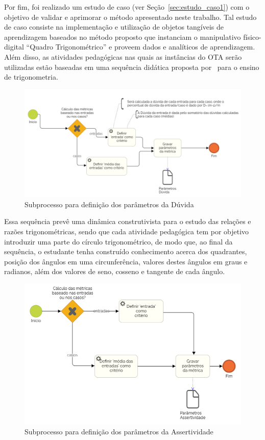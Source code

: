 Por fim, foi realizado um estudo de caso (ver Seção~\ref{sec:estudo_caso1}) com o objetivo de validar e aprimorar o método apresentado neste trabalho. Tal estudo de caso consiste na implementação e utilização de objetos tangíveis de aprendizagem baseados no método proposto que instanciam o manipulativo físico-digital ``Quadro Trigonométrico'' e proveem dados e analíticos de aprendizagem. Além disso, as atividades pedagógicas nas quais as instâncias do OTA serão utilizadas estão baseadas em uma sequência didática proposta por~\cite{silva:2011} para o ensino de trigonometria. 

\begin{figure}[htb]
	\centering
	\includegraphics[width=0.9\linewidth]{chapters/proposedMethod/bpmn_metricas_Duvida.png}
	\caption{Subprocesso para definição dos parâmetros da Dúvida}
	\label{fig:bpmn_metricas_Duvida}
\end{figure}

Essa sequência prevê uma dinâmica construtivista para o estudo das relações e razões trigonométricas, sendo que cada atividade pedagógica tem por objetivo introduzir uma parte do círculo trigonométrico, de modo que, ao final da sequência, o estudante tenha construído conhecimento acerca dos quadrantes, posição dos ângulos em uma circunferência, valores destes ângulos em graus e radianos, além dos valores de seno, cosseno e tangente de cada ângulo.

\begin{figure}[htb]
	\centering
	\includegraphics[width=0.8\linewidth]{chapters/proposedMethod/bpmn_metricas_NA.png}
	\caption{Subprocesso para definição dos parâmetros da Assertividade}
	\label{fig:bpmn_metricas_NA}
\end{figure}

